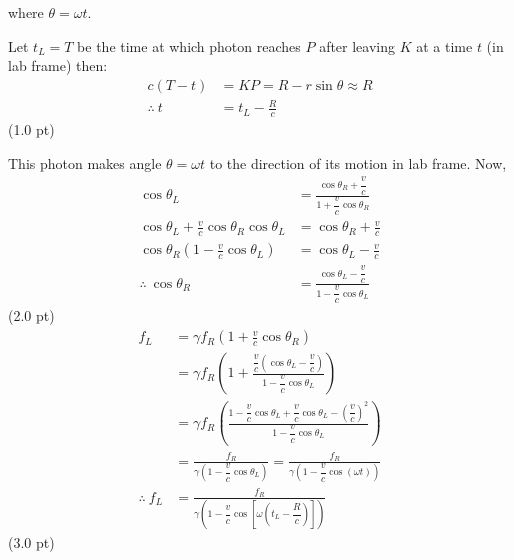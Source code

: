 \begin{description}
  where $\theta = \omega t$.

  Let $t_L = T$ be the time at which photon reaches $P$ after leaving $K$ at
  a time $t$ (in lab frame) then:
  \begin{align*}
    c(T - t) &= KP = R - r\sin\theta \approx R\\
    \therefore\ t &= t_L - \frac{R}{c}
  \end{align*}
  \hfill(1.0 pt)

  This photon makes angle $\theta = \omega t$ to the direction of its motion
  in lab frame. Now,
  \begin{align*}
    \cos\theta_L &= \frac{\cos\theta_R + \dfrac{v}{c}}
                        {1 + \dfrac{v}{c}\cos\theta_R}\\
    \cos\theta_L + \frac{v}{c}\cos\theta_R\cos\theta_L
      &= \cos\theta_R + \frac{v}{c}\\
    \cos\theta_R\left(1 - \frac{v}{c}\cos\theta_L\right)
      &= \cos\theta_L - \frac{v}{c}\\
    \therefore\ \cos\theta_R
      &= \frac{\cos\theta_L - \dfrac{v}{c}}
              {1 - \dfrac{v}{c}\cos\theta_L}
  \end{align*}
  \hfill(2.0 pt)
  \begin{align*}
    f_L &= \gamma f_R\left(1 + \frac{v}{c}\cos\theta_R\right)\\
    &= \gamma f_R\left(1 + \frac{\dfrac{v}{c}
        \left(\cos\theta_L - \dfrac{v}{c}\right)}
        {1 - \dfrac{v}{c}\cos\theta_L}\right)\\
    &= \gamma f_R\left(\frac{1 - \dfrac{v}{c}\cos\theta_L
        + \dfrac{v}{c}\cos\theta_L - \left(\dfrac{v}{c}\right)^2}
        {1 - \dfrac{v}{c}\cos\theta_L}\right)\\
    &= \frac{f_R}{\gamma\left(1 - \dfrac{v}{c}\cos\theta_L\right)}
     = \frac{f_R}{\gamma\left(1 - \dfrac{v}{c}\cos(\omega t)\right)}\\
    \therefore\ f_L
      &= \frac{f_R}{\gamma\left(1 - \dfrac{v}{c}
         \cos\left[\omega\left(t_L - \dfrac{R}{c}\right)\right]\right)}
  \end{align*}
  \hfill(3.0 pt)
\item[(d)] \hspace{0pt}
  \begin{align*}

\end{align*}
\end{description}
